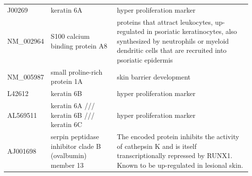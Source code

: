 \documentclass[10pt,a4paper]{report}
\begin{document}
\begin{table}[]
\begin{tabular}{l|p{4.5cm} p{8.5cm}}
			J00269             & keratin 6A                                                                                                              & hyper proliferation marker \cite{jiang2015biomarkers}                                                                                                                                                                                                                 \\
			NM\_002964         & S100 calcium binding protein A8                                                                                         & proteins that attract leukocytes, up-regulated in psoriatic keratinocytes, also synthesized by neutrophils or myeloid dendritic cells that are recruited into psoriatic epidermis \cite{roberson2010psoriasis}                                                          \\
			NM\_005987         & small proline-rich protein 1A                                                                                           & skin barrier development \cite{bergboer2012genetics}                                                                                                                                                                                                                    \\
			L42612             & keratin 6B                                                                                                              & hyper proliferation marker \cite{jiang2015biomarkers}                                                                                                                                                                                                                  \\
			AL569511           & keratin 6A /// keratin 6B /// keratin 6C                                                                                & hyper proliferation marker \cite{jiang2015biomarkers}                                                                                                                                                                                                                  \\
			AJ001698           & serpin peptidase inhibitor  clade B (ovalbumin) member 13                                                               & The encoded protein inhibits the activity of cathepsin K and is itself transcriptionally repressed by RUNX1. Known to be up-regulated in lesional skin. \cite{suarez2012expanding}                                                                                    \\

\end{tabular}
\end{table}
\end{document}
